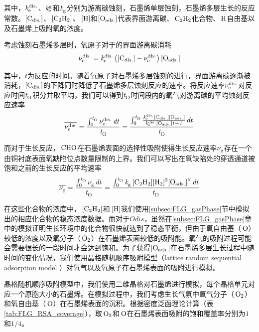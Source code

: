 其中，$\it{k_{\rm e}^{\rm dis.}} \it$、$\it{k_{\rm e}^{\rm g}} \it$和$\it{k_{\rm g}^{\rm }} \it$分别为游离碳蚀刻，石墨烯单层蚀刻，石墨烯多层生长的反应常数。$\rm{\left[C_{dis.}\right]} \it$、$\cemb{[C2H2]}$、$\cemb{[H]}$和$\rm{\left[O_{ads.}\right]} \it$代表界面游离碳、$\cemb{C2H2}$化合物、$\cemb{H}$自由基以及石墨烯上吸附氧的浓度。

考虑蚀刻石墨烯多层时，氧原子对于的界面游离碳消耗\chinesecolon
\begin{equation}
    \it \nu_{\rm e}^{\rm dis.} \it=\it{k_{\rm e}^{\rm dis.}} \it\left(\rm{\left[C_{dis.}\right]} \it-\it \nu_{\rm e}^{\rm dis.} \it\right)\rm{\left[O_{ads.}\right]} \it
\end{equation}

其中，$t$为反应的时间。随着氧原子对石墨烯多层蚀刻的进行，界面游离碳逐渐被消耗，$\rm{\left[C_{dis.}\right]} \it$的下降同时降低了石墨烯多层蚀刻反应的速率。将反应速率$\it \nu_{\rm e}^{\rm dis.} \it$对反应时间$\it{t_{\rm O}^{\rm }} \it$积分并取平均，我们可以得到$\it{t_{\rm O}^{\rm }} \it$时间段内的氧气对游离碳的平均蚀刻反应速率\chinesecolon
\begin{equation}
    \overline{\it \nu_{\rm e}^{\rm dis.} \it}=\frac{\int_{0}^{\it{t_{\rm O}^{\rm }} \it} \it \nu_{\rm e}^{\rm dis.} \it \,dt }{\it{t_{\rm O}^{\rm }} \it}=\frac{\int_{0}^{\it{t_{\rm O}^{\rm }} \it} \frac{\it{k_{\rm e}^{\rm dis.}} \it\rm{\left[C_{dis.}\right]} \it\rm{\left[O_{ads.}\right]} \it}{\it{k_{\rm e}^{\rm dis.}} \it\rm{\left[O_{ads.}\right]} \it \it{t_{\rm }^{\rm }} \it + 1} \,dt}{\it{t_{\rm O}^{\rm }} \it}
\end{equation}

而对于生长反应，$\cemb{CHO}$在石墨烯表面的选择性吸附使得生长反应速率$\it \nu_{\rm g}^{\rm } \it$存在一个由铜衬底表面氧缺陷位点数量限制的上界。我们可以写出在氧缺陷处的穿透通道被饱和之前的生长反应的平均速率\chinesecolon
\begin{equation}
    \overline{\RateV{g}{}}=\frac{\int_{0}^{\ReactTime{O}{}} \RateV{g}{} \,dt }{\ReactTime{O}{}}= \frac{\int_{0}^{\ReactTime{O}{}} \RateK{g}{}\cemb{[C2H2][H2]^2}\Oads^2 \,dt }{\ReactTime{O}{}}
\end{equation}

在这些化合物的浓度中，$\cemb{[C2H2]}$和$\cemb{[H]}$我们使用\ref{subsec:FLG_gasPhase}节中模拟出的相应化合物的稳态浓度数据。而对于$Odis$，虽然在\ref{subsec:FLG_gasPhase}章中的模拟证明生长环境中的化合物很快就达到了稳态平衡，但由于氧自由基（$\cemb{O}$）较低的浓度以及氧分子（$\cemb{O2}$）在石墨烯表面较低的吸附能。氧气的吸附过程可能会需要很长的一段时间才会达到饱和。为了获得$\rm{\left[O_{ads.}\right]} \it$在石墨烯多层生长过程中随时间的变化情况，我们使用晶格随机顺序吸附模型（lattice random sequential adsorption model ）对氧气以及氧原子在石墨烯表面的吸附进行模拟。

晶格随机顺序吸附模型中，我们使用二维晶格对石墨烯进行模拟，每个晶格单元对应一个原胞大小的石墨烯。在模拟过程中，我们考虑生长气氛中氧气分子（$\cemb{O2}$）和氧自由基（$\cemb{O}$）在石墨烯表面的沉积。根据密度泛函理论计算（表\ref{tab:FLG_RSA_coverage}），取$\cemb{O2}$和$\cemb{O}$在石墨烯表面吸附的饱和覆盖率分别为$1$和$1 / 4$。


